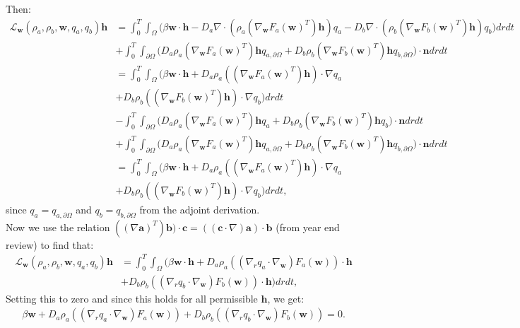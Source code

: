 \documentclass[11pt, a4paper]{article}
\theoremstyle{definition}
\newcommand{\adja}{q_a}
\newcommand{\adjb}{q_b}
\newcommand{\adjaB}{q_{a,\partial \Omega}}
\newcommand{\adjbB}{q_{b,\partial \Omega}}
\newcommand{\ra}{\rho_a}
\newcommand{\rb}{\rho_b}
\newcommand{\w}{\mathbf{w}}
\newcommand{\n}{\mathbf{n}}
\newcommand{\h}{\mathbf{h}}
\begin{document}
Then:
\begin{align*}
\mathcal{L}_{\w}(\ra,\rb, \w, \adja, \adjb) \h  &= \int_0^T \int_\Omega \bigg( \beta \w \cdot \h - D_a \nabla \cdot (\ra \left(\nabla_{\w} F_a(\w)^T\right) \h)  \adja - D_b \nabla \cdot (\rb \left(\nabla_{\w} F_b(\w)^T \right)\h) \adjb \bigg)dr dt \\
&+ \int_0^T \int_{\partial \Omega} \bigg( D_a \ra \left(\nabla_{\w} F_a(\w)^T\right) \h \adjaB   + D_b \rb \left(\nabla_{\w} F_b(\w)^T\right) \h\adjbB     \bigg) \cdot \n dr dt\\
&= \int_0^T \int_\Omega \bigg( \beta \w \cdot \h + D_a \ra \left(\left(\nabla_{\w} F_a(\w)^T\right) \h \right)\cdot\nabla  \adja \\
&+ D_b \rb \left(\left(\nabla_{\w} F_b(\w)^T\right) \h \right)\cdot \nabla \adjb  \bigg)dr dt \\
&- \int_0^T \int_{\partial \Omega} \bigg( D_a \ra \left(\nabla_{\w} F_a(\w)^T\right) \h \adja   + D_b \rb \left(\nabla_{\w} F_b(\w)^T\right) \h\adjb     \bigg) \cdot \n dr dt\\
&+ \int_0^T \int_{\partial \Omega} \bigg( D_a \ra \left(\nabla_{\w} F_a(\w)^T\right) \h \adjaB   + D_b \rb \left(\nabla_{\w} F_b(\w)^T\right) \h\adjbB     \bigg) \cdot \n dr dt\\
&=\int_0^T \int_\Omega \bigg( \beta \w \cdot \h + D_a \ra \left(\left(\nabla_{\w} F_a(\w)^T\right) \h \right)\cdot\nabla  \adja \\
&+ D_b \rb \left(\left(\nabla_{\w} F_b(\w)^T\right) \h \right)\cdot \nabla \adjb  \bigg)dr dt,
\end{align*}
since $\adja = \adjaB$ and $\adjb = \adjbB$ from the adjoint derivation.\\
Now we use the relation $((\nabla \mathbf a)^T)\mathbf b) \cdot \mathbf c= (( \mathbf c \cdot \nabla) \mathbf a ) \cdot \mathbf b$ (from year end review) to find that:
\begin{align*}
\mathcal{L}_{\w}(\ra,\rb, \w, \adja, \adjb) \h  &= \int_0^T \int_\Omega \bigg( \beta \w \cdot \h + D_a \ra \left( \left(\nabla_r \adja \cdot \nabla_{\w} \right) F_a(\w) \right) \cdot \h         \\
&+ D_b \rb \left( \left(\nabla_r \adjb \cdot \nabla_{\w} \right) F_b(\w) \right) \cdot \h       \bigg)dr dt,
\end{align*}
Setting this to zero and since this holds for all permissible $\h$, we get:
\begin{align*}
\beta \w  + D_a \ra \left( \left(\nabla_r \adja \cdot \nabla_{\w} \right) F_a(\w) \right) 
+ D_b \rb \left( \left(\nabla_r \adjb \cdot \nabla_{\w} \right) F_b(\w) \right) = 0.
\end{align*} 
\end{document}
